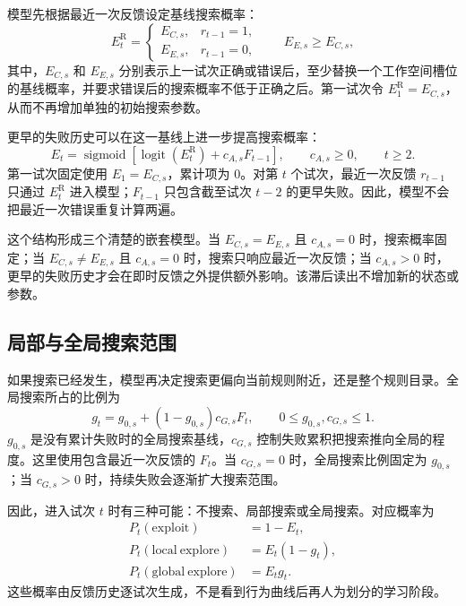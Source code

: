 \documentclass[12pt]{article}
\newcommand{\logit}{\operatorname{logit}}
\newcommand{\sigmoid}{\operatorname{sigmoid}}
\begin{document}
模型先根据最近一次反馈设定基线搜索概率：
\begin{equation}
E_t^{\mathrm R}
=
\begin{cases}
E_{C,s}, & r_{t-1}=1,\\
E_{E,s}, & r_{t-1}=0,
\end{cases}
\qquad
E_{E,s}\geq E_{C,s},
\label{eq:reactive-event}
\end{equation}
其中，$E_{C,s}$ 和 $E_{E,s}$ 分别表示上一试次正确或错误后，至少替换一个工作空间槽位的基线概率，并要求错误后的搜索概率不低于正确之后。第一试次令 $E_1^{\mathrm R}=E_{C,s}$，从而不再增加单独的初始搜索参数。

更早的失败历史可以在这一基线上进一步提高搜索概率：
\begin{equation}
E_t
=\sigmoid\!\left[
\logit(E_t^{\mathrm R})+c_{A,s}F_{t-1}
\right],
\qquad
c_{A,s}\geq0,
\qquad t\geq2.
\label{eq:accumulated-event}
\end{equation}
第一试次固定使用 $E_1=E_{C,s}$，累计项为 0。对第 $t$ 个试次，最近一次反馈 $r_{t-1}$ 只通过 $E_t^{\mathrm R}$ 进入模型；$F_{t-1}$ 只包含截至试次 $t-2$ 的更早失败。因此，模型不会把最近一次错误重复计算两遍。

这个结构形成三个清楚的嵌套模型。当 $E_{C,s}=E_{E,s}$ 且 $c_{A,s}=0$ 时，搜索概率固定；当 $E_{C,s}\neq E_{E,s}$ 且 $c_{A,s}=0$ 时，搜索只响应最近一次反馈；当 $c_{A,s}>0$ 时，更早的失败历史才会在即时反馈之外提供额外影响。该滞后读出不增加新的状态或参数。

\subsection{局部与全局搜索范围}

如果搜索已经发生，模型再决定搜索更偏向当前规则附近，还是整个规则目录。全局搜索所占的比例为
\begin{equation}
g_t
=g_{0,s}+(1-g_{0,s})c_{G,s}F_t,
\qquad
0\leq g_{0,s},c_{G,s}\leq1.
\label{eq:global-search}
\end{equation}
$g_{0,s}$ 是没有累计失败时的全局搜索基线，$c_{G,s}$ 控制失败累积把搜索推向全局的程度。这里使用包含最近一次反馈的 $F_t$。当 $c_{G,s}=0$ 时，全局搜索比例固定为 $g_{0,s}$；当 $c_{G,s}>0$ 时，持续失败会逐渐扩大搜索范围。

因此，进入试次 $t$ 时有三种可能：不搜索、局部搜索或全局搜索。对应概率为
\begin{align}
P_t(\mathrm{exploit})&=1-E_t,
\nonumber\\
P_t(\mathrm{local\ explore})&=E_t(1-g_t),
\nonumber\\
P_t(\mathrm{global\ explore})&=E_tg_t.
\label{eq:strategy-probabilities}
\end{align}
这些概率由反馈历史逐试次生成，不是看到行为曲线后再人为划分的学习阶段。
\end{document}
